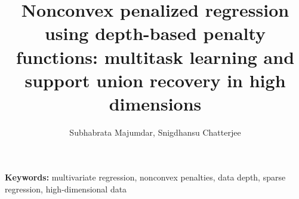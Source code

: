 \documentclass[fleqn,12pt]{article}
\begin{document}
\newtheorem{Theorem}{Theorem}[section]
\newtheorem{Lemma}[Theorem]{Lemma}
\newtheorem{Corollary}[Theorem]{Corollary}
\newtheorem{Proposition}[Theorem]{Proposition}
\newtheorem{Conjecture}[Theorem]{Conjecture}
\theoremstyle{definition} \newtheorem{Definition}[Theorem]{Definition}

\title{Nonconvex penalized regression using depth-based penalty functions: multitask learning and support union recovery in high dimensions}
\date{}
\author{Subhabrata Majumdar, Snigdhansu Chatterjee}
\maketitle



\vspace{.5cm}

\textbf{Keywords:} multivariate regression, nonconvex penalties, data depth, sparse regression, high-dimensional data

\newpage













\newpage





\clearpage

\end{document}
